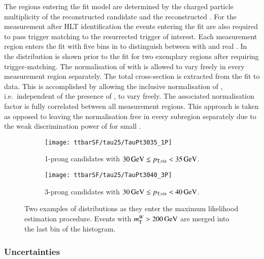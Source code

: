 The regions entering the fit model are determined by the charged
particle multiplicity of the reconstructed \tauhadvis candidate and
the reconstructed \tauhadvis \pT. For the measurement after HLT
\tauhadvis identification the events entering the fit are also
required to pass trigger matching to the resurrected trigger of
interest. Each measurement region enters the fit with five bins in
\mTW to distinguish between \ttbar with \faketauhadvis and real
\tauhadvis. In~ the \mTW
distribution is shown prior to the fit for two exemplary regions after
requiring trigger-matching.  The normalisation of \ttbar with
\faketauhadvis is allowed to vary freely in every measurement region
separately. The total \ttbar cross-section is extracted from the fit
to data. This is accomplished by allowing the inclusive normalisation
of \ttbar, i.e.\ independent of the presence of \faketauhadvis, to
vary freely. The associated normalisation factor is fully correlated
between all measurement regions. This approach is taken as opposed to
leaving the \ttbar normalisation free in every subregion separately
due to the weak discrimination power of \mTW for small \tauhadvis \pT.

\begin{figure}[htbp]
  \centering

  \begin{subfigure}{.485\textwidth}
    \texttt{[image: ttbarSF/tau25/TauPt3035\_1P]}
    \caption{1-prong \tauhadvis candidates with
      $\SI{30}{\ensuremath{\text{GeV}}} \leq p_\text{T,vis} < \SI{35}{\ensuremath{\text{GeV}}}$.}
  \end{subfigure}\hfill%
  \begin{subfigure}{.485\textwidth}
    \texttt{[image: ttbarSF/tau25/TauPt3040\_3P]}
    \caption{3-prong \tauhadvis candidates with
      $\SI{30}{\GeV} \leq \pTvis < \SI{40}{\GeV}$.}
  \end{subfigure}

  \caption{Two examples of \mTW distributions as they enter the
    maximum likelihood estimation procedure. Events with
    $m_{\text{T}}^W > \SI{200}{\ensuremath{\text{GeV}}}$ are merged into the last bin of the
    histogram.}
  \label{fig:ttbarsf_mtw_examples_prefit}
\end{figure}


\subsubsection{Uncertainties}

